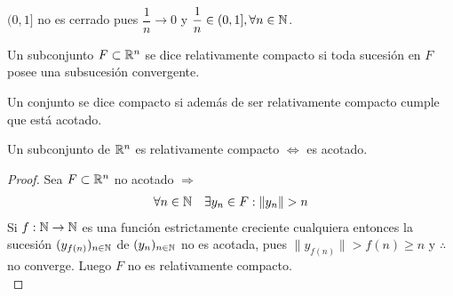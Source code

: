 \begin{eg}
  $(0, 1]$ no es cerrado pues $\dfrac{1}{n} \to 0$ y $\dfrac{1}{n} \in (0, 1], \forall n \in \mathbb{N}$.
\end{eg}

\begin{definition}
  Un subconjunto $F \subset \mathbb{R}^n$ se dice relativamente compacto si toda sucesión en $F$ posee una subsucesión convergente.
\end{definition}

\begin{definition}[Compacto]
  Un conjunto se dice compacto si además de ser relativamente compacto cumple que está acotado.
\end{definition}

\begin{prop}
  Un subconjunto de $\mathbb{R}^n$ es relativamente compacto $\iff$ es acotado.
  \begin{proof}
    Sea $F \subset \mathbb{R}^n$ no acotado $\Rightarrow$
    \begin{align*}
      \forall  n \in \mathbb{N} \quad \exists y_n \in F : \|y_n\| > n
    \end{align*}
    Si $f : \mathbb{N} \to \mathbb{N}$ es una función estrictamente creciente cualquiera entonces la sucesión $(y_{f(n)})_{n \in \mathbb{N}}$ de $(y_n)_{n \in \mathbb{N}}$ no es acotada, pues $\|y_{f(n)}\| > f(n) \geq n$ y $\therefore$ no converge. Luego $F$ no es relativamente compacto. \\


\end{proof}
\end{prop}
